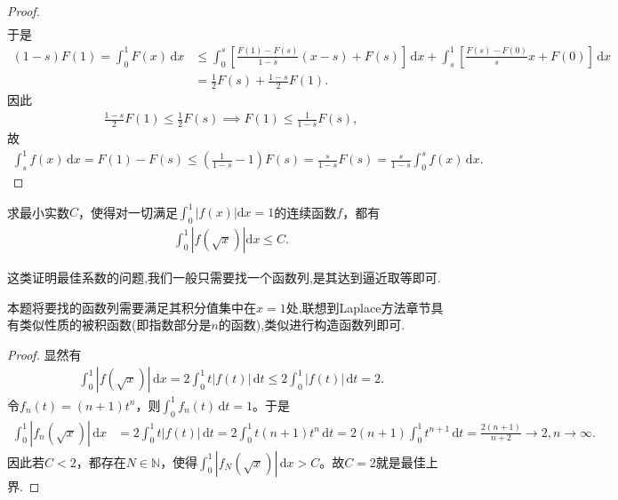 \documentclass[../../main.tex]{subfiles}%
\begin{document}
\begin{proof}
\begin{align*}
\end{align*}
于是
\begin{align*}
(1 - s) F(1) = \int_0^1 F(x) \, \mathrm{d}x &\leqslant  \int_0^s \left[ \frac{F(1) - F(s)}{1 - s}(x - s) + F(s) \right] \, \mathrm{d}x + \int_s^1 \left[ \frac{F(s) - F(0)}{s}x + F(0) \right] \, \mathrm{d}x \\
&= \frac{1}{2} F(s) + \frac{1 - s}{2} F(1).
\end{align*}
因此
\begin{align*}
\frac{1 - s}{2} F(1) \leqslant  \frac{1}{2} F(s) \implies F(1) \leqslant  \frac{1}{1 - s} F(s),
\end{align*}
故
\begin{align*}
\int_s^1 f(x) \, \mathrm{d}x = F(1) - F(s) \leqslant  \left( \frac{1}{1 - s} - 1 \right) F(s) = \frac{s}{1 - s} F(s) = \frac{s}{1 - s} \int_0^s f(x) \, \mathrm{d}x.
\end{align*}

\end{proof}

\begin{example}
求最小实数$C$，使得对一切满足$\int_{0}^{1}|f(x)|\mathrm{d}x = 1$的连续函数$f$，都有
\begin{align*}
\int_{0}^{1}|f(\sqrt{x})|\mathrm{d}x \leqslant C.
\end{align*}
\end{example}
\begin{remark}
这类证明最佳系数的问题,我们一般只需要找一个函数列,是其达到逼近取等即可.

本题将要找的函数列需要满足其积分值集中在$x=1$处,联想到Laplace方法章节具有类似性质的被积函数(即指数部分是$n$的函数),类似进行构造函数列即可.
\end{remark}
\begin{proof}

显然有
\begin{align*}
\int_0^1 |f(\sqrt{x})| \, \mathrm{d}x = 2 \int_0^1 t |f(t)| \, \mathrm{d}t \leqslant 2 \int_0^1 |f(t)| \, \mathrm{d}t = 2.
\end{align*}
令$f_n(t) = (n+1) t^n$，则$\int_0^1 f_n(t) \, \mathrm{d}t = 1$。于是
\begin{align*}
\int_0^1 |f_n(\sqrt{x})| \, \mathrm{d}x &= 2 \int_0^1 t |f(t)| \, \mathrm{d}t = 2 \int_0^1 t (n+1) t^n \, \mathrm{d}t 
= 2 (n+1) \int_0^1 t^{n+1} \, \mathrm{d}t = \frac{2(n+1)}{n+2} \to 2, n \to \infty.
\end{align*}
因此若$C < 2$，都存在$N \in \mathbb{N}$，使得$\int_0^1 |f_N(\sqrt{x})| \, \mathrm{d}x > C$。故$C = 2$就是最佳上界.

\end{proof}
\end{document}
